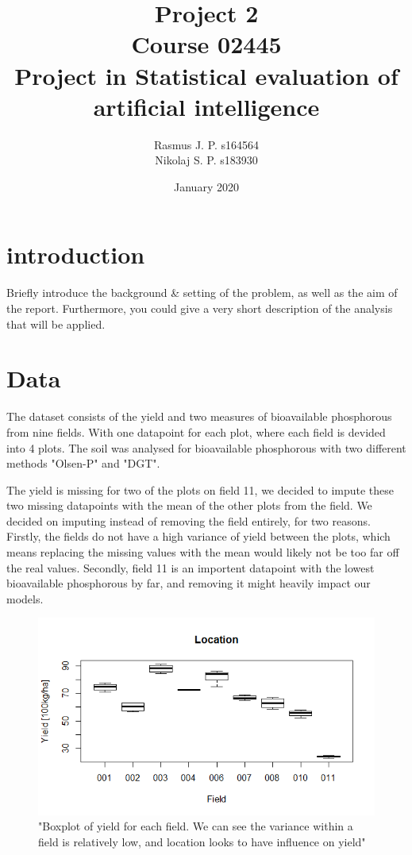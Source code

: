 \documentclass{article}
\begin{document}
\begin{titlepage}
	
	
	\title{Project 2 \\ Course 02445 \\ Project in Statistical evaluation of \\ artificial intelligence }
	\author{Rasmus J. P. s164564 \\ Nikolaj S. P. s183930}
	\date{January 2020}
	\maketitle
\end{titlepage}

\section{introduction}
Briefly introduce the background \& setting of the problem, as well as the aim of the report.
Furthermore, you could give a very short description of the analysis that will be applied.

\section{Data}
The dataset consists of the yield and two measures of bioavailable phosphorous from nine fields.
With one datapoint for each plot, where each field is devided into 4 plots.
The soil was analysed for bioavailable phosphorous with two different methods "Olsen-P" and "DGT".


The yield is missing for two of the plots on field 11,
we decided to impute these two missing datapoints with the mean of the other plots from the field.
We decided on imputing instead of removing the field entirely, for two reasons.
Firstly, the fields do not have a high variance of yield between the plots, which means replacing the missing values with the mean would likely not be too far off the real values.
Secondly, field 11 is an importent datapoint with the lowest bioavailable phosphorous by far, and removing it might heavily impact our models.
 
\begin{figure}[H]
\includegraphics[width=\linewidth]{locationYield.png}
\caption{"Boxplot of yield for each field. We can see the variance within a field is relatively low, and location looks to have influence on yield"}
\label{fig:loc}
\end{figure}
\end{document}
